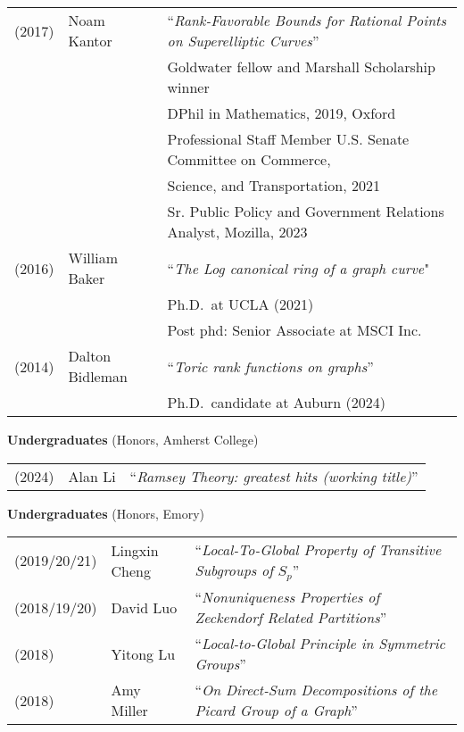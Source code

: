 \documentclass[margin,line]{res}
\newcommand{\defi}[1]{\textsf{#1}} 				%
\begin{document}
\begin{resume}
\begin{tabular}{lll}
  (2017) & \defi{Noam Kantor} & ``\emph{Rank-Favorable Bounds for Rational Points on Superelliptic Curves}'' \\
         &&   Goldwater fellow and Marshall Scholarship winner \\
         &&  DPhil in Mathematics, 2019,  Oxford \\
         &&  Professional Staff Member U.S. Senate Committee on Commerce,\\
         &&  \hspace{3pt} Science, and Transportation, 2021   \\
         &&  Sr. Public Policy and Government Relations Analyst, Mozilla, 2023   \\   
  (2016) & \defi{William Baker} & ``\emph{The Log canonical ring of a graph curve}" \\
         &&    Ph.D.~at UCLA (2021)\\
         &&    Post phd: Senior Associate at MSCI Inc.\\
  (2014) & \defi{Dalton Bidleman} & ``\emph{Toric rank functions on graphs}'' \\
  && Ph.D.~candidate at Auburn (2024)\\

\end{tabular}


{\bf Undergraduates} (Honors, Amherst College)
\vspace*{-.15in}

\begin{tabular}{lll}
  (2024) & \defi{Alan Li} & ``\emph{Ramsey Theory: greatest hits (working title)}''
\end{tabular}

{\bf Undergraduates} (Honors, Emory)
\vspace*{-.15in}

\begin{tabular}{lll}
  (2019/20/21) & \defi{Lingxin Cheng} & ``\emph{Local-To-Global Property of Transitive Subgroups of} $S_p$''\\
  (2018/19/20) & \defi{David Luo} & ``\emph{Nonuniqueness Properties of Zeckendorf Related Partitions}'' \\
  (2018) & \defi{Yitong Lu} & ``\emph{Local-to-Global Principle in Symmetric Groups}'' \\
  (2018) & \defi{Amy Miller} & ``\emph{On Direct-Sum Decompositions of the Picard Group of a Graph}''
\end{tabular}


\end{resume}
\end{document}
